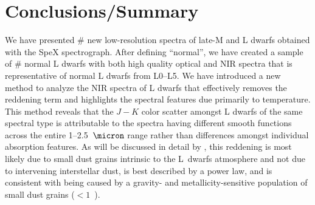 \documentclass[12pt,preprint]{aastex}
\begin{document}
% 
                                     
\section{Conclusions/Summary}
\label{sec:summary}

We have presented \# new low-resolution spectra of late-M and L dwarfs obtained with the SpeX spectrograph.
After defining ``normal'', we have created a sample of \# normal L dwarfs with both high quality optical and NIR spectra that is representative of normal L dwarfs from L0--L5.
We have introduced a new method to analyze the NIR spectra of L dwarfs that effectively removes the reddening term and highlights the spectral features due primarily to temperature. 
This method reveals that the $J-K$ color scatter amongst L dwarfs of the same spectral type is attributable to the spectra having different smooth functions across the entire 1--2.5~$\micron$ range rather than differences amongst individual absorption features.
As will be discussed in detail by \citet[in prep.]{Hiranaka13}, this reddening is most likely due to small dust grains intrinsic to the L~dwarfs atmosphere and not due to intervening interstellar dust, is best described by a power law, and is consistent with being caused by a gravity- and metallicity-sensitive population of small dust grains ($<1$~\micron).
\end{document}
